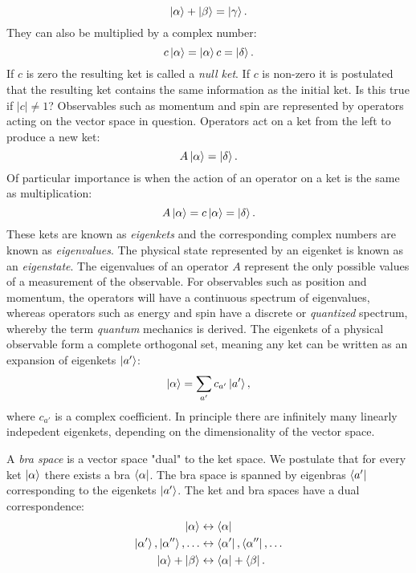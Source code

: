 \begin{equation}
\ket{\alpha} + \ket{\beta} = \ket{\gamma} .
\end{equation}
They can also be multiplied by a complex number:
\begin{equation}
c\ket{\alpha} = \ket{\alpha}c = \ket{\delta} .
\end{equation}
If $c$ is zero the resulting ket is called a \textit{null ket}.
If $c$ is non-zero it is postulated that the resulting ket contains
the same information as the initial ket. {\color{red} Is this true if $|c|\not = 1$?}
\newline
Observables such as momentum and spin are represented by operators
acting on the vector space in question. Operators
act on a ket from the left to produce a new ket:
\begin{equation}
A \ket{\alpha} = \ket{\delta} .
\end{equation}
Of particular importance is when the action of an operator
on a ket is the same as multiplication:
\begin{equation}
A \ket{\alpha} = c\ket{\alpha} = \ket{\delta} .
\end{equation}
These kets are known as \textit{eigenkets} and the corresponding
complex numbers are known as \textit{eigenvalues}.
The physical state represented by an eigenket is known
as an \textit{eigenstate}.
The eigenvalues of an operator $A$ represent
the only possible values of a measurement of the observable.
For observables such as position and momentum, the operators
will have a continuous spectrum of eigenvalues, whereas
operators such as energy and spin have a discrete or
\textit{quantized} spectrum, whereby the term
\textit{quantum} mechanics is derived.
The eigenkets of a physical observable form
a complete orthogonal set, meaning any ket
can be written as an expansion of eigenkets $\ket{a'}$:
\begin{equation}
\ket{\alpha} = \sum_{a'} c_{a'} \ket{a'} ,
\end{equation}
where $c_{a'}$ is a complex coefficient.
In principle there are infinitely many linearly indepedent eigenkets,
depending on the dimensionality of the vector space.
\par
A \textit{bra space} is a vector space "dual" to the ket space.
We postulate that for every ket $\ket{\alpha}$ there exists a bra
$\bra{\alpha}$. The bra space is spanned by eigenbras $\bra{a'}$
corresponding to the eigenkets $\ket{a'}$. The ket and bra spaces
have a dual correspondence:
\begin{equation}
\begin{split}
\ket{\alpha} &\leftrightarrow \bra{\alpha} \\
\ket{\alpha '}, \ket{\alpha ''},\dots &\leftrightarrow \bra{\alpha '},
    \bra{\alpha ''},\dots \\
\ket{\alpha} + \ket{\beta} &\leftrightarrow \bra{\alpha} + \bra{\beta} .
\end{split}
\end{equation}
